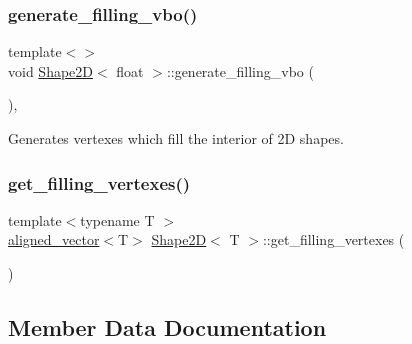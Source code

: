 \mbox{\label{classShape2D_a328d401b8f1962078e904d4b1003d7a5}} 
\subsubsection{\texorpdfstring{generate\+\_\+filling\+\_\+vbo()}{generate\_filling\_vbo()}\hspace{0.1cm}{\footnotesize\ttfamily [2/2]}}
{\footnotesize\ttfamily template$<$$>$ \\
void \mbox{\hyperlink{classShape2D}{Shape2D}}$<$ float $>$\+::generate\+\_\+filling\+\_\+vbo (\begin{DoxyParamCaption}{ }\end{DoxyParamCaption})\hspace{0.3cm}{\ttfamily [inline]}, {\ttfamily [protected]}}



Generates vertexes which fill the interior of 2D shapes. 

\mbox{\label{classShape2D_af67c7aed6e58b5aa0e3518a3ad1de75b}} 
\subsubsection{\texorpdfstring{get\+\_\+filling\+\_\+vertexes()}{get\_filling\_vertexes()}}
{\footnotesize\ttfamily template$<$typename T $>$ \\
\mbox{\hyperlink{type__definitions_8hpp_accb98a876f193a416d9c8a02fe22d526}{aligned\+\_\+vector}}$<$T$>$ \mbox{\hyperlink{classShape2D}{Shape2D}}$<$ T $>$\+::get\+\_\+filling\+\_\+vertexes (\begin{DoxyParamCaption}{ }\end{DoxyParamCaption})\hspace{0.3cm}{\ttfamily [inline]}}



\subsection{Member Data Documentation}
\mbox{\label{classShape2D_a220cf4cf96da8bd43627ffffd00a0718}} 

